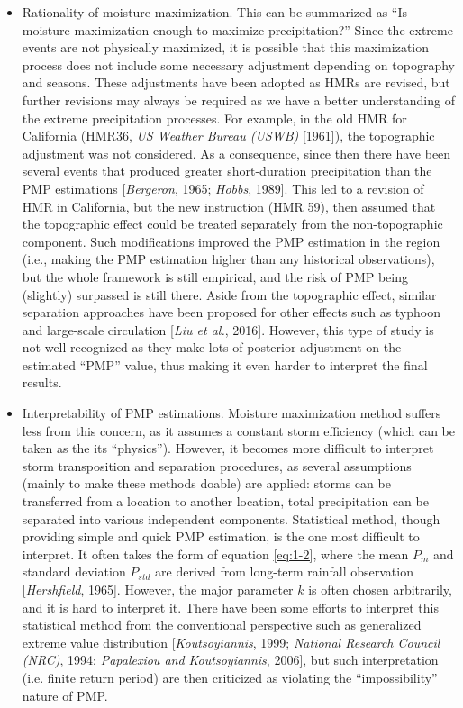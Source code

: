 \begin{itemize}
\item Rationality of moisture maximization. This can be summarized as ``Is moisture maximization enough to maximize precipitation?'' Since the extreme events are not physically maximized, it is possible that this maximization process does not include some necessary adjustment depending on topography and seasons. These adjustments have been adopted as HMRs are revised, but further revisions may always be required as we have a better understanding of the extreme precipitation processes. For example, in the old HMR for California (HMR36, \textit{US Weather Bureau (USWB)} [1961]), the topographic adjustment was not considered. As a consequence, since then there have been several events that produced greater short-duration precipitation than the PMP estimations [\textit{Bergeron}, 1965; \textit{Hobbs}, 1989]. This led to a revision of HMR in California, but the new instruction (HMR 59), then assumed that the topographic effect could be treated separately from the non-topographic component. Such modifications improved the PMP estimation in the region (i.e., making the PMP estimation higher than any historical observations), but the whole framework is still empirical, and the risk of PMP being (slightly) surpassed is still there. Aside from the topographic effect, similar separation approaches have been proposed for other effects such as typhoon and large-scale circulation [\textit{Liu et al.}, 2016]. However, this type of study is not well recognized as they make lots of posterior adjustment on the estimated ``PMP'' value, thus making it even harder to interpret the final results.

\item Interpretability of PMP estimations. Moisture maximization method suffers less from this concern, as it assumes a constant storm efficiency (which can be taken as the its ``physics''). However, it becomes more difficult to interpret storm transposition and separation procedures, as several assumptions (mainly to make these methods doable) are applied: storms can be transferred from a location to another location, total precipitation can be separated into various independent components. Statistical method, though providing simple and quick PMP estimation, is the one most difficult to interpret. It often takes the form of equation \ref{eq:1-2}, where the mean $P_{m}$ and standard deviation $P_{std}$ are derived from long-term rainfall observation [\textit{Hershfield}, 1965]. However, the major parameter $k$ is often chosen arbitrarily, and it is hard to interpret it. There have been some efforts to interpret this statistical method from the conventional perspective such as generalized extreme value distribution [\textit{Koutsoyiannis}, 1999; \textit{National Research Council (NRC)}, 1994; \textit{Papalexiou and Koutsoyiannis}, 2006], but such interpretation (i.e. finite return period) are then criticized as violating the ``impossibility'' nature of PMP.


\end{itemize}
